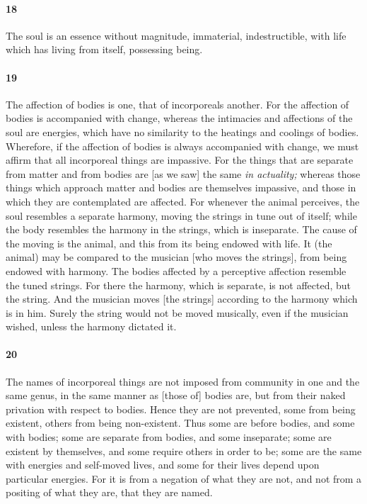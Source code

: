 \documentclass[12pt]{article}
\begin{document}
\paragraph{18} The soul is an essence without magnitude, immaterial,
indestructible, with life which has living from itself, possessing being.

\paragraph{19} The affection of bodies is one, that of incorporeals another.
For the affection of bodies is accompanied with change, whereas the intimacies
and affections of the soul are energies, which have no similarity to the
heatings and coolings of bodies. Wherefore, if the affection of bodies is
always accompanied with change, we must affirm that all incorporeal things are
impassive. For the things that are separate from matter and from bodies are [as
we saw] the same \textit{in actuality;} whereas those things which approach
matter and bodies are themselves impassive, and those in which they are
contemplated are affected. For whenever the animal perceives, the soul
resembles a separate harmony, moving the strings in tune out of itself; while
the body resembles the harmony in the strings, which is inseparate. The cause
of the moving is the animal, and this from its being endowed with life. It (the
animal) may be compared to the musician [who moves the strings], from being
endowed with harmony. The bodies affected by a perceptive affection resemble
the tuned strings. For there the harmony, which is separate, is not affected,
but the string. And the musician moves [the strings] according to the harmony
which is in him. Surely the string would not be moved musically, even if the
musician wished, unless the harmony dictated it.

\paragraph{20} The names of incorporeal things are not imposed from community
in one and the same genus, in the same manner as [those of] bodies are, but
from their naked privation with respect to bodies. Hence they are not
prevented, some from being existent, others from being non-existent. Thus some
are before bodies, and some with bodies; some are separate from bodies, and
some inseparate; some are existent by themselves, and some require others in
order to be; some are the same with energies and self-moved lives, and some for
their lives depend upon particular energies. For it is from a negation of what
they are not, and not from a positing of what they are, that they are named.
\end{document}
